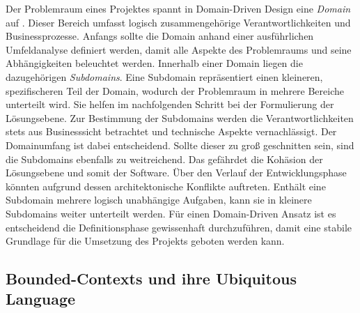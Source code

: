 Der Problemraum eines Projektes spannt in Domain-Driven Design eine \emph{Domain} auf \cite[S. 56]{Vernon.2015}. Dieser Bereich umfasst logisch zusammengehörige Verantwortlichkeiten und Businessprozesse. Anfangs sollte die Domain anhand einer ausführlichen Umfeldanalyse definiert werden, damit alle Aspekte des Problemraums und seine Abhängigkeiten beleuchtet werden. Innerhalb einer Domain liegen die dazugehörigen \emph{Subdomains}. Eine Subdomain repräsentiert einen kleineren, spezifischeren Teil der Domain, wodurch der Problemraum in mehrere Bereiche unterteilt wird. Sie helfen im nachfolgenden Schritt bei der Formulierung der Lösungsebene. Zur Bestimmung der Subdomains werden die Verantwortlichkeiten stets aus Businesssicht betrachtet und technische Aspekte vernachlässigt. Der Domainumfang ist dabei entscheidend. Sollte dieser zu groß geschnitten sein, sind die Subdomains ebenfalls zu weitreichend. Das gefährdet die Kohäsion der Lösungsebene und somit der Software. Über den Verlauf der Entwicklungsphase könnten aufgrund dessen architektonische Konflikte auftreten. Enthält eine Subdomain mehrere logisch unabhängige Aufgaben, kann sie in kleinere Subdomains weiter unterteilt werden. Für einen Domain-Driven Ansatz ist es entscheidend die Definitionsphase gewissenhaft durchzuführen, damit eine stabile Grundlage für die Umsetzung des Projekts geboten werden kann. 

\subsection{Bounded-Contexts und ihre Ubiquitous Language}

